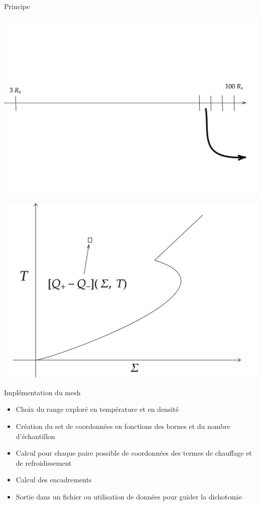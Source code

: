 \documentclass{beamer}
\begin{document}
\begin{frame}{Principe}
	\begin{minipage}[c]{.46\linewidth}
      \includegraphics[width = 0.95\linewidth]{DecoupeR}
   \end{minipage} \hfill
   \begin{minipage}[c]{.46\linewidth}
      \includegraphics[width = 0.95\linewidth]{SPrincipe}
   \end{minipage}
\end{frame}

\begin{frame}{Implémentation du mesh}
\begin{itemize}
	\item Choix du range exploré en température et en densité
	\item Création du set de coordonnées en fonctions des bornes et du nombre d'échantillon
	\item Calcul pour chaque paire possible de coordonnées des termes de chauffage et de refroidissement
	\item Calcul des encadrements
	\item Sortie dans un fichier ou utilisation de données pour guider la dichotomie
\end{itemize}
\end{frame}
\end{document}
